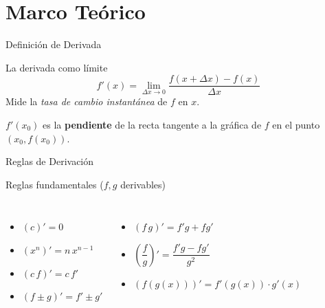 \documentclass[aspectratio=169]{beamer}
\begin{document}
\begin{frame}[plain]
  \titlepage
\end{frame}

\section{Marco Teórico}

\begin{frame}{Definición de Derivada}
  \begin{block}{La derivada como límite}
    \[
      f'(x) = \lim_{\Delta x \to 0}\frac{f(x+\Delta x) - f(x)}{\Delta x}
    \]
    Mide la \emph{tasa de cambio instantánea} de $f$ en $x$.
  \end{block}
  \vspace{6pt}
  \begin{mwextra}
    $f'(x_0)$ es la \textbf{pendiente} de la recta tangente a la gráfica de $f$ en el punto $(x_0, f(x_0))$.
  \end{mwextra}
\end{frame}

\begin{frame}{Reglas de Derivación}
  \begin{block}{Reglas fundamentales ($f,g$ derivables)}
    \begin{columns}[T]
      \begin{itemize}
        \item $(c)' = 0$
        \item $(x^n)' = n\,x^{n-1}$
        \item $(c\,f)' = c\,f'$
        \item $(f \pm g)' = f' \pm g'$
      \end{itemize}
      \begin{itemize}
        \item $(f\,g)' = f'g + fg'$
        \item $\left(\dfrac{f}{g}\right)' = \dfrac{f'g - fg'}{g^2}$
        \item $(f(g(x)))' = f'(g(x))\cdot g'(x)$
      \end{itemize}
    \end{columns}
  \end{block}
\end{frame}
\end{document}
